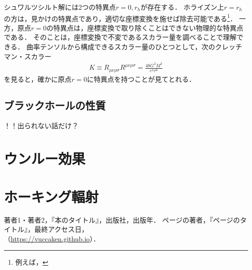 \documentclass[uplatex,dvipdfmx]{vkaishi}
\begin{document}
シュワルツシルト解には2つの特異点$r = 0, r_h$が存在する．
ホライズン上$r = r_h$の方は，見かけの特異点であり，適切な座標変換を施せば除去可能である\footnote{例えば，}．
一方，原点$r = 0$の特異点は，座標変換で取り除くことはできない物理的な特異点である．
そのことは，座標変換で不変であるスカラー量を調べることで理解できる．
曲率テンソルから構成できるスカラー量のひとつとして，次のクレッチマン・スカラー
\begin{align}
  K \equiv R_{\mu\nu\rho\sigma} R^{\mu\nu\rho\sigma} = \frac{48 G^2 M^2}{c^4 r^6}
\end{align}
を見ると，確かに原点$r = 0$に特異点を持つことが見てとれる．


\subsection{ブラックホールの性質}

！！出られない話だけ？






\section{ウンルー効果}



\section{ホーキング輻射}




\begin{thebibliography}{99}
   著者1・著者2，『本のタイトル』，出版社，出版年．
   ページの著者，『ページのタイトル』，最終アクセス日，\\（\url{https://vuccaken.github.io}）．
\end{thebibliography}
\end{document}
